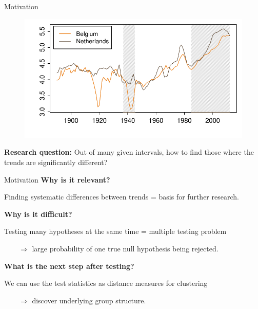\documentclass[10pt, handout]{beamer}
\begin{document}
\begin{frame}{Motivation}
{\begin{figure}
  	\end{figure}}	
	{\onslide<4->
	\vspace{-46,81mm}
	\begin{figure}
    		\centering
    		\includegraphics[height=0.45\textheight]{plots/hp_BEL_NLD_2.pdf}
  	\end{figure}}	
\vspace{-3mm}
{\textbf{Research question:}
	Out of many given intervals, how to find those where the trends are significantly different?}


\end{frame}

\begin{frame}{Motivation}
\vspace{-4mm}
\textbf{Why is it relevant?}

Finding systematic differences between trends = basis for further research.\pause


\vspace{3mm}

\textbf{Why is it difficult?}	

Testing many hypotheses at the same time = multiple testing problem

$\quad \quad \Rightarrow$ large probability of one true null hypothesis being rejected.\pause

\vspace{3mm}

\textbf{What is the next step after testing?}

We can use the test statistics as distance measures for clustering

$\quad \quad \Rightarrow$ discover underlying group structure.
 
\end{frame}
\end{document}
